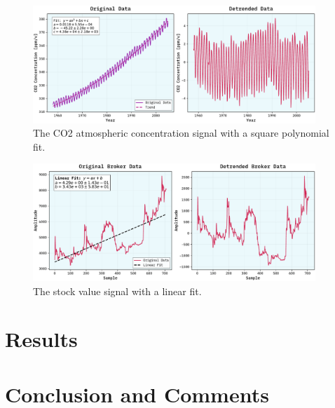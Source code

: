\documentclass[10pt, titlepage, a4paper]{article}
\begin{document}
\begin{figure}[H]
    \centering
    \includegraphics[width=0.95\textwidth]{../MaxEntropy/Images/detrended-co2.pdf}
    \caption{The CO2 atmospheric concentration signal with a square polynomial fit.}
    \label{fig:detrended-1}
\end{figure}

\begin{figure}[H]
    \centering
    \includegraphics[width=0.95\textwidth]{../LinForecast/Images/borza-detrended.pdf}
    \caption{The stock value signal with a linear fit.}
    \label{fig:detrended-2}
\end{figure}

\section{Results}
\section{Conclusion and Comments}

% 
% 

\end{document}
